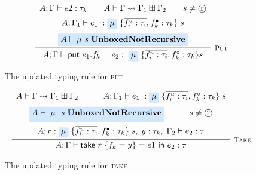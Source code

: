 \begin{figure}
    \centering
    \begin{align*}
        \infer[\textsc{\footnotesize{Put}}]{
            A;\Gamma \vdash \textsf{put } e_1.f_k  = e_2 : \; \colorbox{highlighteq}{$\mu$} \; \{ \overline{f_i^u : \tau_i}, f_k^\circ : \tau_k \} s
        }{
            \begin{array}{c}
                A;\Gamma \vdash e2 : \tau_k
                \hspace{2em}
                A \vdash \Gamma \rightsquigarrow \Gamma_1 \boxplus \Gamma_2
                \hspace{2em}
                s \neq \text{\textcircled{r}}
                \vspace{0.5em} \\
                A;\Gamma_1 \vdash e_1\; : \colorbox{highlighteq}{$\mu$}\; \{ \overline{f_i^u : \tau_i}, f_k^\bullet : \tau_k \}\; s
                \vspace{0.5em} \\
                \colorbox{highlighteq}{$A \vdash \mu \textit{ s } \textbf{UnboxedNotRecursive}$}
            \end{array}
        }
    \end{align*}
    
    \caption{The updated typing rule for \textsc{put}}
    \label{fig:puttypingrule}
\end{figure}

\begin{figure}
    \centering
    \begin{align*}
        \infer[\textsc{\footnotesize{Take}}]{
            A;\Gamma \vdash \textsf{take } r\; \{ f_k = y \} = e1 \textsf{ in } e_2 : \tau
        }{
            \begin{array}{c}
                A \vdash \Gamma \rightsquigarrow \Gamma_1 \boxplus \Gamma_2
                \hspace{3em}
                A;\Gamma_1 \vdash e_1\; : \colorbox{highlighteq}{$\mu$}\; \{ \overline{f_i^u : \tau_i}, f_k^\circ : \tau_k \}\; s
                \vspace{0.5em} \\
                \colorbox{highlighteq}{$A \vdash \colorbox{highlighteq}{$\mu$} \textit{ s } \textbf{UnboxedNotRecursive}$}
                \hspace{3em}
                s \neq \text{\textcircled{r}}
                \vspace{0.5em} \\
                A; r : \colorbox{highlighteq}{$\mu$}\; \{ \overline{f_i^u : \tau_i}, f_k^\bullet : \tau_k \}\; s
                ,\; y : \tau_k,\; \Gamma_2 \vdash e_2 : \tau
            \end{array}
        }
    \end{align*}
    
    \caption{The updated typing rule for \textsc{take}}
    \label{fig:taketypingrule}
\end{figure}

